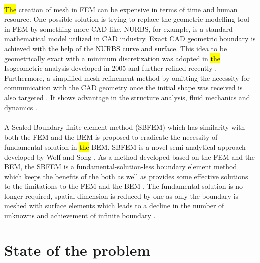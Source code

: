\paragraph{}
\hl{The} creation of mesh in FEM can be expensive in terms of time and human resource.
One possible solution is trying to replace the geometric modelling tool in FEM by something more CAD-like.
NURBS, for example, is a standard mathematical model utilized in CAD industry.
Exact CAD geometric boundary is achieved with the help of the NURBS curve and surface.
This idea to be geometrically exact with a minimum discretization was adopted in \hl{the} Isogeometric analysis developed in 2005 \citep{Hug2005b} and further refined recently \citep{Zhang2007,Hug2005b,Cot2006,Cot2009,Baz2006a,Baz2006b}.
Furthermore, a simplified mesh refinement method by omitting the necessity for communication with the CAD geometry once the initial shape was received is also targeted \citep{Cot2007}.
It shows advantage in the structure analysis, fluid mechanics \citep{Buf2011} and dynamics \citep{Cot2006}.

\paragraph{}
A Scaled Boundary finite element method (SBFEM) which has similarity with both the FEM and the BEM is proposed to eradicate the necessity of fundamental solution in \hl{the} BEM.
SBFEM is a novel semi-analytical approach developed by Wolf and Song \citep{Wol1999}.
As a method developed based on the FEM and the BEM, the SBFEM is a fundamental-solution-less boundary element method which keeps the benefits of the both as well as provides some effective solutions to the limitations to the FEM and the BEM \citep{Wol1999}.
The fundamental solution is no longer required, spatial dimension is reduced by one as only the boundary is meshed with surface elements which leads to a decline in the number of unknowns and achievement of infinite boundary \citep{Wol2003}.


\section{State of the problem}
\label{intro_sec:problem}
